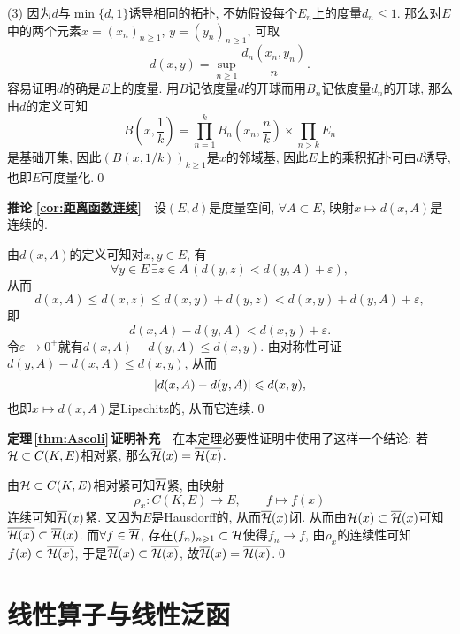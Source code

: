 \begin{Proof}
	(3) 因为$ d $与$ \min\{d,1\} $诱导相同的拓扑, 不妨假设每个$ E_n $上的度量$ d_n\leqslant 1 $. 那么对$ E $中的两个元素$ x=(x_n)_{n\geqslant 1} $, $ y=(y_n)_{n\geqslant 1} $, 可取
	\[
	d(x,y)=\sup_{n\geqslant 1}\frac{d_n(x_n,y_n)}{n}.
	\]
	容易证明$ d $的确是$ E $上的度量. 用$ B $记依度量$ d $的开球而用$ B_n $记依度量$ d_n $的开球, 那么由$ d $的定义可知
	\[
	B\left(x,\frac{1}{k}\right)=\prod_{n=1}^kB_n\left(x_n,\frac{n}{k}\right)\times\prod_{n>k}E_n
	\]
	是基础开集, 因此$ (B(x,1/k))_{k\geqslant 1} $是$ x $的邻域基, 因此$ E $上的乘积拓扑可由$ d $诱导, 也即$ E $可度量化.\qed
	     
	\end{Proof}
	
	\textbf{推论\,\,\ref{cor:距离函数连续}}\ \ 设$ (E,d) $是度量空间, $ \forall A\subset E $, 映射$ x\mapsto d(x,A) $是连续的.
	\begin{Proof}
	由$ d(x,A) $的定义可知对$ x,y\in E $, 有
	\[
	\forall y\in E\,\exists z\in A\,(d(y,z)<d(y,A)+\varepsilon),
	\]
	从而
	\[
	d(x,A)\leqslant d(x,z)\leqslant d(x,y)+d(y,z)<d(x,y)+d(y,A)+\varepsilon,
	\]
	即
	\[
	d(x,A)-d(y,A)<d(x,y)+\varepsilon.
	\]
	令$ \varepsilon\to 0^+ $就有$ d(x,A)-d(y,A)\leqslant d(x,y) $. 由对称性可证$ d(y,A)-d(x,A)\leqslant d(x,y) $, 从而
	\[
	\left| d(x,A)-d(y,A) \right| \leqslant d(x,y),
	\]
	也即$ x\mapsto d(x,A) $是Lipschitz的, 从而它连续.\qed
	\end{Proof}
	
	\textbf{定理\,\ref{thm:Ascoli}\,证明补充}\ \ 在本定理必要性证明中使用了这样一个结论: 若$ \mathcal{H}\subset C(K,E) $相对紧, 那么$ \overline{\mathcal{H}}(x)=\overline{\mathcal{H}(x)} $.
	\begin{Proof}
	由$ \mathcal{H}\subset C(K,E) $相对紧可知$ \overline{\mathcal{H}} $紧, 由映射
	\[
	\rho_x : C(K,E)\to E,\qquad f\mapsto f(x)
	\]
	连续可知$ \overline{\mathcal{H}}(x) $紧. 又因为$ E $是Hausdorff的, 从而$ \overline{\mathcal{H}}(x) $闭. 从而由$ \mathcal{H}(x)\subset\overline{\mathcal{H}}(x) $可知$ \overline{\mathcal{H}(x)}\subset\overline{\mathcal{H}}(x) $. 而$ \forall f\in\overline{\mathcal{H}} $, 存在$ (f_n)_{n\geqslant1}\subset\mathcal{H} $使得$ f_n\to f $, 由$ \rho_x $的连续性可知$ f(x)\in\overline{\mathcal{H}(x)} $, 于是$ \overline{\mathcal{H}}(x)\subset\overline{\mathcal{H}(x)} $, 故$ \overline{\mathcal{H}}(x)=\overline{\mathcal{H}(x)} $.\qed
	\end{Proof}
	
	\section{线性算子与线性泛函}
	
